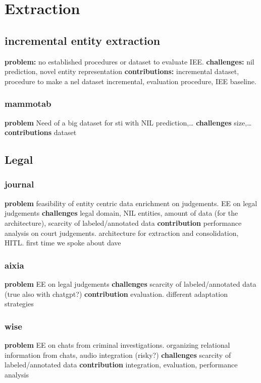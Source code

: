 \section{Extraction}

\subsection{incremental entity extraction}
\textbf{problem:} no established procedures or dataset to evaluate IEE.
\textbf{challenges:} nil prediction, novel entity representation
\textbf{contributions:} incremental dataset, procedure to make a nel dataset incremental, evaluation procedure, IEE baseline.

\subsubsection{mammotab}
\textbf{problem} Need of a big dataset for sti with NIL prediction,\dots
\textbf{challenges} size,\dots
\textbf{contributions} dataset

\subsection{Legal}

\subsubsection{journal}
\textbf{problem} feasibility of entity centric data enrichment on judgements. EE on legal judgements
\textbf{challenges} legal domain, NIL entities, amount of data (for the architecture), scarcity of labeled/annotated data
\textbf{contribution} performance analysis on court judgements. architecture for extraction and consolidation, HITL. first time we spoke about dave

\subsubsection{aixia}
\textbf{problem} EE on legal judgements
\textbf{challenges} scarcity of labeled/annotated data (true also with chatgpt?)
\textbf{contribution} evaluation. different adaptation strategies

\subsubsection{wise}
\textbf{problem} EE on chats from criminal investigations. organizing relational information from chats, audio integration (risky?)
\textbf{challenges} scarcity of labeled/annotated data
\textbf{contribution} integration, evaluation, performance analysis

